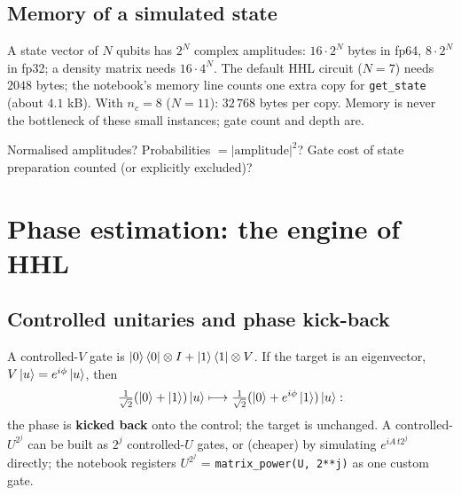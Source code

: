 \documentclass[11pt,a4paper,openany]{book}
\begin{document}
\subsection{Memory of a simulated state}
A state vector of $N$ qubits has $2^N$ complex amplitudes: $16\cdot2^N$ bytes in fp64, $8\cdot2^N$ in fp32; a density matrix needs $16\cdot4^N$.
The default HHL circuit ($N = 7$) needs $2048$ bytes; the notebook's memory line counts one extra copy for \texttt{get\_state} (about $4.1$ kB).
With $n_c = 8$ ($N = 11$): $32\,768$ bytes per copy. Memory is never the bottleneck of these small instances; gate count and depth are.
\begin{checklist}
Normalised amplitudes? Probabilities $= |\text{amplitude}|^2$? Gate cost of state preparation counted (or explicitly excluded)?
\end{checklist}

\section{Phase estimation: the engine of HHL}
\subsection{Controlled unitaries and phase kick-back}
A controlled-$V$ gate is $\ket0\bra0\otimes I + \ket1\bra1\otimes V$. If the target is an eigenvector, $V\ket u = e^{i\phi}\ket u$, then
\[ \tfrac{1}{\sqrt2}(\ket0 + \ket1)\ket u \longmapsto \tfrac{1}{\sqrt2}(\ket0 + e^{i\phi}\ket1)\ket u: \]
the phase is \textbf{kicked back} onto the control; the target is unchanged. A controlled-$U^{2^j}$ can be built as $2^j$ controlled-$U$ gates, or (cheaper) by
simulating $e^{iA\,t2^j}$ directly; the notebook registers $U^{2^j}$ = \texttt{matrix\_power(U, 2**j)} as one custom gate.
\end{document}
